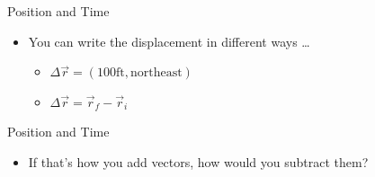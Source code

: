 \documentclass{beamer}
\begin{document}
\begin{frame}{Position and Time}
\begin{itemize}
   \item You can write the displacement in different ways \ldots
   \begin{itemize}
      \item<1-> $\Delta \vec{r} = (100\mathrm{ft, northeast})$
      \item<2-> $\Delta \vec{r} = \vec{r}_f - \vec{r}_i$
   \end{itemize}
\end{itemize}
\begin{center}
\end{center}
\end{frame}

\begin{frame}{Position and Time}
\begin{itemize}
   \item If that's how you add vectors, how would you subtract them?
\end{itemize}
\begin{center}
\end{center}
\end{frame}
\end{document}
